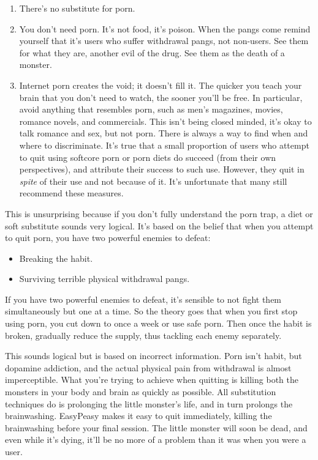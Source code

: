 \documentclass[
]{book}
\begin{document}
\begin{enumerate}
\def\labelenumi{\arabic{enumi}.}
\item
  There's no substitute for porn.
\item
  You don't need porn. It's not food, it's poison. When the pangs come remind yourself that it's users who suffer withdrawal pangs, not non-users. See them for what they are, another evil of the drug. See them as the death of a monster.
\item
  Internet porn creates the void; it doesn't fill it. The quicker you teach your brain that you don't need to watch, the sooner you'll be free. In particular, avoid anything that resembles porn, such as men's magazines, movies, romance novels, and commercials. This isn't being closed minded, it's okay to talk romance and sex, but not porn. There is always a way to find when and where to discriminate. It's true that a small proportion of users who attempt to quit using softcore porn or porn diets do succeed (from their own perspectives), and attribute their success to such use. However, they quit in \emph{spite} of their use and not because of it. It's unfortunate that many still recommend these measures.
\end{enumerate}

This is unsurprising because if you don't fully understand the porn trap, a diet or soft substitute sounds very logical. It's based on the belief that when you attempt to quit porn, you have two powerful enemies to defeat:

\begin{itemize}
\item
  Breaking the habit.
\item
  Surviving terrible physical withdrawal pangs.
\end{itemize}

If you have two powerful enemies to defeat, it's sensible to not fight them simultaneously but one at a time. So the theory goes that when you first stop using porn, you cut down to once a week or use safe porn. Then once the habit is broken, gradually reduce the supply, thus tackling each enemy separately.

This sounds logical but is based on incorrect information. Porn isn't habit, but dopamine addiction, and the actual physical pain from withdrawal is almost imperceptible. What you're trying to achieve when quitting is killing both the monsters in your body and brain as quickly as possible. All substitution techniques do is prolonging the little monster's life, and in turn prolongs the brainwashing. EasyPeasy makes it easy to quit immediately, killing the brainwashing before your final session. The little monster will soon be dead, and even while it's dying, it'll be no more of a problem than it was when you were a user.
\end{document}
